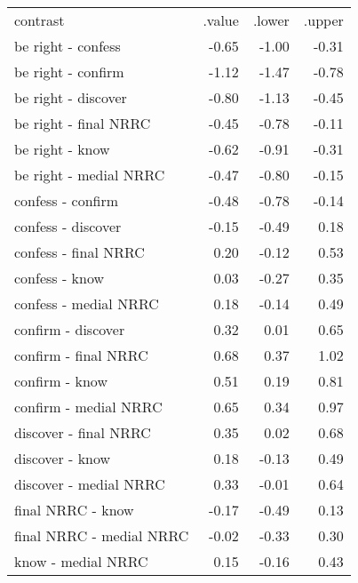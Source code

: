 \begin{longtable}{lrrr}
 contrast & .value & .lower & .upper \\ 
 be right - confess & -0.65 & -1.00 & -0.31 \\ 
  be right - confirm & -1.12 & -1.47 & -0.78 \\ 
  be right - discover & -0.80 & -1.13 & -0.45 \\ 
  be right - final NRRC & -0.45 & -0.78 & -0.11 \\ 
  be right - know & -0.62 & -0.91 & -0.31 \\ 
  be right - medial NRRC & -0.47 & -0.80 & -0.15 \\ 
  confess - confirm & -0.48 & -0.78 & -0.14 \\ 
  confess - discover & -0.15 & -0.49 & 0.18 \\ 
  confess - final NRRC & 0.20 & -0.12 & 0.53 \\ 
  confess - know & 0.03 & -0.27 & 0.35 \\ 
  confess - medial NRRC & 0.18 & -0.14 & 0.49 \\ 
  confirm - discover & 0.32 & 0.01 & 0.65 \\ 
  confirm - final NRRC & 0.68 & 0.37 & 1.02 \\ 
  confirm - know & 0.51 & 0.19 & 0.81 \\ 
  confirm - medial NRRC & 0.65 & 0.34 & 0.97 \\ 
  discover - final NRRC & 0.35 & 0.02 & 0.68 \\ 
  discover - know & 0.18 & -0.13 & 0.49 \\ 
  discover - medial NRRC & 0.33 & -0.01 & 0.64 \\ 
  final NRRC - know & -0.17 & -0.49 & 0.13 \\ 
  final NRRC - medial NRRC & -0.02 & -0.33 & 0.30 \\ 
  know - medial NRRC & 0.15 & -0.16 & 0.43 \\ 
  \end{longtable}

